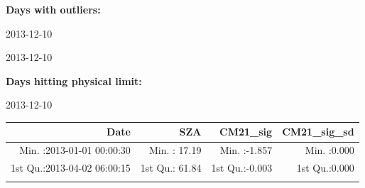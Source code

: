 \documentclass[
  10pt,
  a4paper,oneside]{article}
\begin{document}
\normalsize

\textbf{Days with outliers:}

2013-12-10

2013-12-10

\textbf{Days hitting physical limit:}

2013-12-10

\footnotesize

\begin{longtable}[]{@{}rrrr@{}}
\toprule
\begin{minipage}[b]{0.33\columnwidth}\raggedleft
Date\strut
\end{minipage} & \begin{minipage}[b]{0.19\columnwidth}\raggedleft
SZA\strut
\end{minipage} & \begin{minipage}[b]{0.19\columnwidth}\raggedleft
CM21\_sig\strut
\end{minipage} & \begin{minipage}[b]{0.19\columnwidth}\raggedleft
CM21\_sig\_sd\strut
\end{minipage}\tabularnewline
\midrule
\endhead
\begin{minipage}[t]{0.33\columnwidth}\raggedleft
Min. :2013-01-01 00:00:30\strut
\end{minipage} & \begin{minipage}[t]{0.19\columnwidth}\raggedleft
Min. : 17.19\strut
\end{minipage} & \begin{minipage}[t]{0.19\columnwidth}\raggedleft
Min. :-1.857\strut
\end{minipage} & \begin{minipage}[t]{0.19\columnwidth}\raggedleft
Min. :0.000\strut
\end{minipage}\tabularnewline
\begin{minipage}[t]{0.33\columnwidth}\raggedleft
1st Qu.:2013-04-02 06:00:15\strut
\end{minipage} & \begin{minipage}[t]{0.19\columnwidth}\raggedleft
1st Qu.: 61.84\strut
\end{minipage} & \begin{minipage}[t]{0.19\columnwidth}\raggedleft
1st Qu.:-0.003\strut
\end{minipage} & \begin{minipage}[t]{0.19\columnwidth}\raggedleft
1st Qu.:0.000\strut
\end{minipage}\tabularnewline
\begin{minipage}[t]{0.33\columnwidth}\raggedleft

\end{minipage}
\end{longtable}
\end{document}
